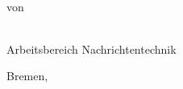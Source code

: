 \thispagestyle{empty}
\vfill

\begin{huge}
  \begin{bf}
    \centerline{%
     }
  \end{bf}
\end{huge}
\vfill

\begin{center}
  \begin{LARGE}
    \Arbeitsart\\
    von\\
    {\sc \Autor}\\
  \end{LARGE}
    \vfill
    \vfill
    \vfill


  \begin{Large}
    Arbeitsbereich Nachrichtentechnik\\
    \vfill

    Bremen, \Berichtsdatum
  \end{Large}
\end{center}
\vfill
\clearemptydoublepage


\thispagestyle{empty}
\vfill

\vfill

